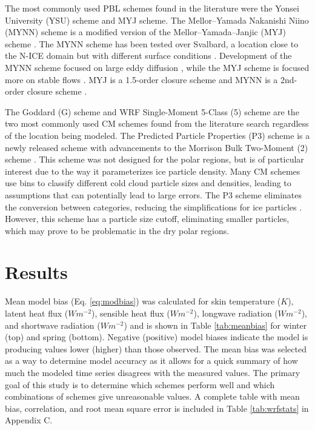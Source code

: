 The most commonly used PBL schemes found in the literature were the Yonsei University (YSU) scheme \citep{hong:2004} and MYJ scheme. The Mellor–Yamada Nakanishi Niino (MYNN) scheme \citep{olson:2019} is a modified version of the Mellor–Yamada–Janjic (MYJ) scheme \citep{mesinger:1993}. The MYNN scheme has been tested over Svalbard, a location close to the N-ICE domain but with different surface conditions \citep{pilguj:2018}. Development of the MYNN scheme focused on large eddy diffusion \citep{cohen:2015}, while the MYJ scheme is focused more on stable flows \citep{janjic:1994, mellor:1982}. MYJ is a 1.5-order closure scheme and MYNN is a 2nd-order closure scheme \citep{pilguj:2018}.

The Goddard (G) scheme \citep{tao:2000} and WRF Single-Moment 5-Class (5) scheme \citep{hong:2004} are the two most commonly used CM schemes found from the literature search regardless of the location being modeled. The Predicted Particle Properties (P3) scheme is a newly released scheme with advancements to the Morrison Bulk Two-Moment (2) scheme \citep{milbrandt:2016, morrison:2015}. This scheme was not designed for the polar regions, but is of particular interest due to the way it parameterizes ice particle density. Many CM schemes use bins to classify different cold cloud particle sizes and densities, leading to assumptions that can potentially lead to large errors. The P3 scheme eliminates the conversion between categories, reducing the simplifications for ice particles \citep{morrison:2005}. However, this scheme has a particle size cutoff, eliminating smaller particles, which may prove to be problematic in the dry polar regions.


\section{Results}

 Mean model bias (Eq. \ref{eq:modbias}) was calculated for skin temperature ($K$), latent heat flux ($Wm^{-2}$), sensible heat flux ($Wm^{-2}$), longwave radiation ($Wm^{-2}$), and shortwave radiation ($Wm^{-2}$) and is shown in Table \ref{tab:meanbias} for winter (top) and spring (bottom). Negative (positive) model biases indicate the model is producing values lower (higher) than those observed. The mean bias was selected as a way to determine model accuracy as it allows for a quick summary of how much the modeled time series disagrees with the measured values. The primary goal of this study is to determine which schemes perform well and which combinations of schemes give unreasonable values. A complete table with mean bias, correlation, and root mean square error is included in Table \ref{tab:wrfstats} in Appendix C.

